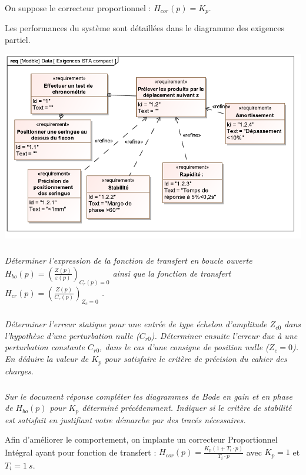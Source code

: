 \documentclass[10pt,fleqn]{article} %
\begin{document}
\begin{multicols}{2}
On suppose le correcteur proportionnel : $H_{cor}(p)=K_p$.

Les performances du système sont détaillées dans le diagramme des exigences partiel.%


	\begin{center}
			\includegraphics[width=1.0\linewidth]{images/req.pdf}
    \end{center}


\subparagraph{}\textit{Déterminer l'expression de la fonction de transfert en boucle ouverte $H_{bo}(p)=\left(\frac{Z(p)}{\varepsilon(p)}\right)_{C_r(p)=0}$ ainsi que la fonction de transfert $H_{cr}(p)=\left(\frac{Z(p)}{C_r(p)}\right)_{Z_c=0}$
.}

\subparagraph{}\textit{Déterminer l'erreur statique pour une entrée de type échelon d'amplitude $Z_{c0}$ dans l'hypothèse d'une perturbation nulle ($C_{r0}$). Déterminer ensuite l'erreur due à une perturbation constante $C_{r0}$, dans le cas d'une
consigne de position nulle ($Z_c=0$). En déduire la valeur de $K_p$ pour satisfaire le critère de précision du cahier des charges.}


\subparagraph{}\textit{Sur le document réponse %
compléter les diagrammes de Bode en gain et en phase de $H_{bo}(p)$ pour $K_p$ déterminé précédemment. Indiquer si le critère de stabilité est satisfait en justifiant votre démarche par des tracés nécessaires.}

Afin d'améliorer le comportement, on implante un correcteur Proportionnel Intégral ayant pour fonction de transfert : $H_{cor}(p)=\frac{K_p\left(1+T_i\cdot p\right)}{T_i\cdot p}$ avec $K_p=1$ et $T_i = \SI{1}{s}$.


\end{multicols}
\end{document}
